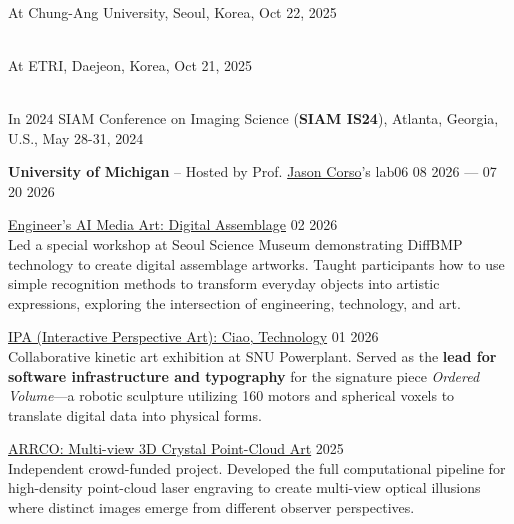 \begin{cvcontent}
\\
At Chung-Ang University, Seoul, Korea, Oct 22, 2025

\\
At ETRI, Daejeon, Korea, Oct 21, 2025

\\
In 2024 SIAM Conference on Imaging Science (\textbf{SIAM IS24}), Atlanta, Georgia, U.S., May 28-31, 2024

\end{cvcontent}
\begin{cvcontent}
\textbf{University of Michigan} -- Hosted by Prof. \href{https://web.eecs.umich.edu/~jjcorso/}{Jason Corso}'s lab\hfill {06 08 2026 --- 07 20 2026}

\end{cvcontent}
\begin{cvcontent}
\href{https://yeyak.seoul.go.kr/web/reservation/selectReservView.do?rsv_svc_id=S260206141656111035}{Engineer's AI Media Art: Digital Assemblage} \hfill {02 2026}\\
Led a special workshop at Seoul Science Museum demonstrating DiffBMP technology to create digital assemblage artworks. Taught participants how to use simple recognition methods to transform everyday objects into artistic expressions, exploring the intersection of engineering, technology, and art.

\href{https://culture.snu.ac.kr/event/ipa}{IPA (Interactive Perspective Art): Ciao, Technology} \hfill {01 2026}\\
Collaborative kinetic art exhibition at SNU Powerplant. Served as the \textbf{lead for software infrastructure and typography} for the signature piece \textit{Ordered Volume}---a robotic sculpture utilizing 160 motors and spherical voxels to translate digital data into physical forms.

\href{https://tumblbug.com/arrco}{ARRCO: Multi-view 3D Crystal Point-Cloud Art} \hfill {2025}\\
Independent crowd-funded project. Developed the full computational pipeline for high-density point-cloud laser engraving to create multi-view optical illusions where distinct images emerge from different observer perspectives.

\end{cvcontent}

